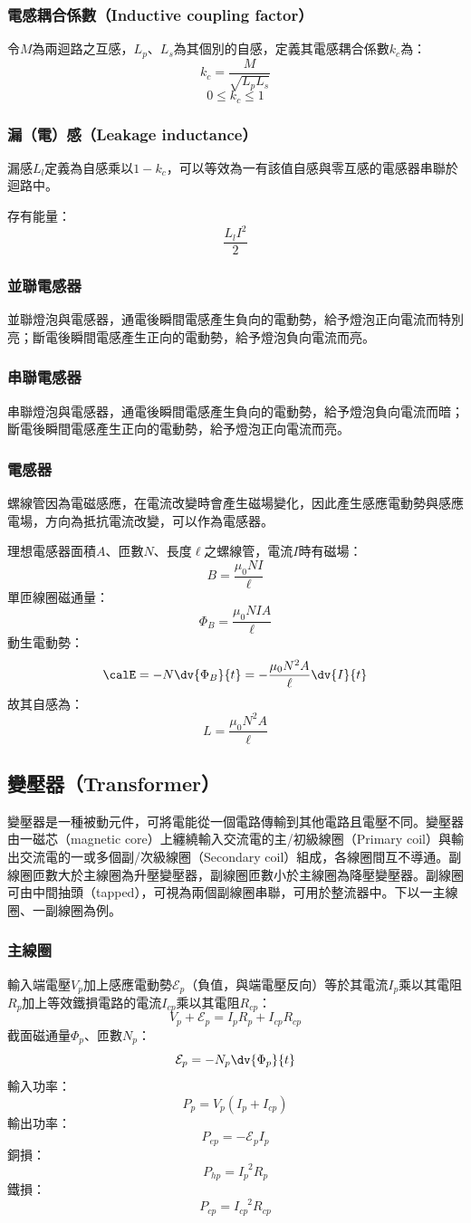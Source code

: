 \documentclass[a4paper,12pt]{report}
\begin{document}
\begin{itemize}
\subsubsection{電感耦合係數（Inductive coupling factor）}
令$M$為兩迴路之互感，$L_p$、$L_s$為其個別的自感，定義其電感耦合係數$k_c$為：
\[k_c=\frac{M}{\sqrt{L_pL_s}}\]
\[0\le k_c\le 1\]
\subsubsection{漏（電）感（Leakage inductance）}
漏感$L_l$定義為自感乘以$1-k_c$，可以等效為一有該值自感與零互感的電感器串聯於迴路中。

存有能量：
\[\frac{L_lI^2}{2}\]
\subsubsection{並聯電感器}
並聯燈泡與電感器，通電後瞬間電感產生負向的電動勢，給予燈泡正向電流而特別亮；斷電後瞬間電感產生正向的電動勢，給予燈泡負向電流而亮。
\subsubsection{串聯電感器}
串聯燈泡與電感器，通電後瞬間電感產生負向的電動勢，給予燈泡負向電流而暗；斷電後瞬間電感產生正向的電動勢，給予燈泡正向電流而亮。
\subsubsection{電感器}
螺線管因為電磁感應，在電流改變時會產生磁場變化，因此產生感應電動勢與感應電場，方向為抵抗電流改變，可以作為電感器。

理想電感器面積$A$、匝數$N$、長度$\ell$之螺線管，電流$I$時有磁場：
\[B=\frac{\mu_0NI}{\ell}\]
單匝線圈磁通量：
\[\Phi_B=\frac{\mu_0NIA}{\ell}\]
動生電動勢：
\[\calE=-N\dv{\Phi_B}{t}=-\frac{\mu_0N^2A}{\ell}\dv{I}{t}\]
故其自感為：
\[L=\frac{\mu_0N^2A}{\ell}\]
\subsection{變壓器（Transformer）}
變壓器是一種被動元件，可將電能從一個電路傳輸到其他電路且電壓不同。變壓器由一磁芯（magnetic core）上纏繞輸入交流電的主/初級線圈（Primary coil）與輸出交流電的一或多個副/次級線圈（Secondary coil）組成，各線圈間互不導通。副線圈匝數大於主線圈為升壓變壓器，副線圈匝數小於主線圈為降壓變壓器。副線圈可由中間抽頭（tapped），可視為兩個副線圈串聯，可用於整流器中。下以一主線圈、一副線圈為例。
\subsubsection{主線圈}
輸入端電壓$V_p$加上感應電動勢$\mathcal{E}_p$（負值，與端電壓反向）等於其電流$I_p$乘以其電阻$R_p$加上等效鐵損電路的電流$I_{cp}$乘以其電阻$R_{cp}$：
\[V_p+\mathcal{E}_p=I_pR_p+I_{cp}R_{cp}\]
截面磁通量$\Phi_p$、匝數$N_p$：
\[\mathcal{E}_p=-N_p\dv{\Phi_p}{t}\]
輸入功率：
\[P_p=V_p(I_p+I_{cp})\]
輸出功率：
\[P_{ep}=-\mathcal{E}_pI_p\]
銅損：
\[P_{hp}=I_p^{\phantom{p}2}R_p\]
鐵損：
\[P_{cp}=I_{cp}^{\phantom{cp}2}R_{cp}\]

\end{itemize}
\end{document}
